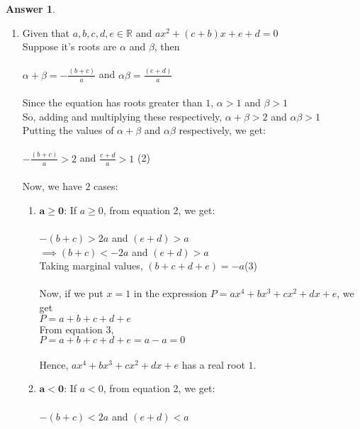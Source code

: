 \documentclass[a4paper]{article}
\theoremstyle{definition}
\newtheorem{answer}{Answer}
\begin{document}
\begin{answer}
\begin{enumerate}
        \item Given that $a, b, c, d, e \in \mathbb{R}$ and $ax^2 + (c + b)x + e + d = 0$\\
        Suppose it's roots are $\alpha$ and $\beta$, then\\\\
        $\alpha + \beta = - \frac{\left(b + c\right)}{a}$ and $\alpha \beta = \frac{\left(e + d\right)}{a}$\\\\
        Since the equation has roots greater than $1$,
        $\alpha > 1$ and $\beta > 1$\\
        So, adding and multiplying these respectively, $\alpha + \beta > 2$ and $\alpha \beta > 1$\\
        Putting the values of $\alpha + \beta$ and $\alpha \beta$ respectively, we get:\\\\
        $- \frac{\left(b + c\right)}{a} > 2$ and $\frac{e + d}{a} > 1$ \space\space\space\space(2)\\\\
        Now, we have $2$ cases:
        \begin{enumerate}
            \item $\boldsymbol{a \geq 0}$: If $a \geq 0$, from equation 2, we get:\\\\
            $- \left(b + c\right) > 2a$ and $\left(e + d\right) > a$\\
            $\implies \left(b + c\right) < -2a$ and $\left(e + d\right) > a$\\
            Taking marginal values, $(b + c + d + e) = -a$\space\space\space\space(3)\\\\
            Now, if we put $x = 1$ in the expression $P = ax^4 + bx^3 + cx^2 + dx + e$, we get\\
            $P = a + b + c + d + e$\\
            From equation 3, \\
            $P = a + b + c + d + e = a - a = 0$\\\\
            Hence, $ax^4 + bx^3 + cx^2 + dx + e$ has a real root $1$.
            \item $\boldsymbol{a < 0}$: If $a < 0$, from equation 2, we get:\\\\
            $- \left(b + c\right) < 2a$ and $\left(e + d\right) < a$\\

\end{enumerate}
\end{enumerate}
\end{answer}
\end{document}
